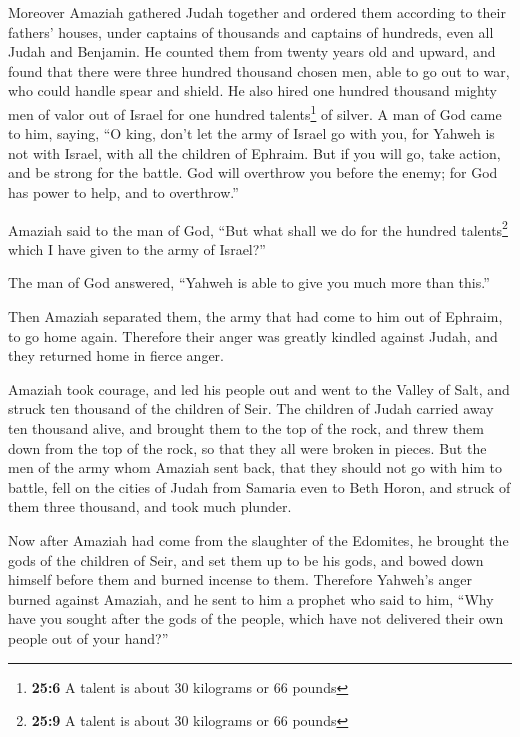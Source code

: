 \begin{paracol}{2}
\begin{otherlanguage}{english}
 Moreover Amaziah gathered Judah together and ordered them
according to their fathers' houses, under captains of thousands and
captains of hundreds, even all Judah and Benjamin. He counted them from
twenty years old and upward, and found that there were three hundred
thousand chosen men, able to go out to war, who could handle spear and
shield.  He also hired one hundred thousand mighty men of
valor out of Israel for one hundred talents\footnote{\textbf{25:6} A
  talent is about 30 kilograms or 66 pounds} of silver.  A
man of God came to him, saying, ``O king, don't let the army of Israel
go with you, for Yahweh is not with Israel, with all the children of
Ephraim.  But if you will go, take action, and be strong
for the battle. God will overthrow you before the enemy; for God has
power to help, and to overthrow.''

 Amaziah said to the man of God, ``But what shall we do
for the hundred talents\footnote{\textbf{25:9} A talent is about 30
  kilograms or 66 pounds} which I have given to the army of Israel?''

The man of God answered, ``Yahweh is able to give you much more than
this.''

 Then Amaziah separated them, the army that had come to
him out of Ephraim, to go home again. Therefore their anger was greatly
kindled against Judah, and they returned home in fierce anger.

 Amaziah took courage, and led his people out and went to
the Valley of Salt, and struck ten thousand of the children of Seir.
 The children of Judah carried away ten thousand alive,
and brought them to the top of the rock, and threw them down from the
top of the rock, so that they all were broken in pieces. 
But the men of the army whom Amaziah sent back, that they should not go
with him to battle, fell on the cities of Judah from Samaria even to
Beth Horon, and struck of them three thousand, and took much plunder.

 Now after Amaziah had come from the slaughter of the
Edomites, he brought the gods of the children of Seir, and set them up
to be his gods, and bowed down himself before them and burned incense to
them.  Therefore Yahweh's anger burned against Amaziah,
and he sent to him a prophet who said to him, ``Why have you sought
after the gods of the people, which have not delivered their own people
out of your hand?''


\end{otherlanguage}
\end{paracol}
